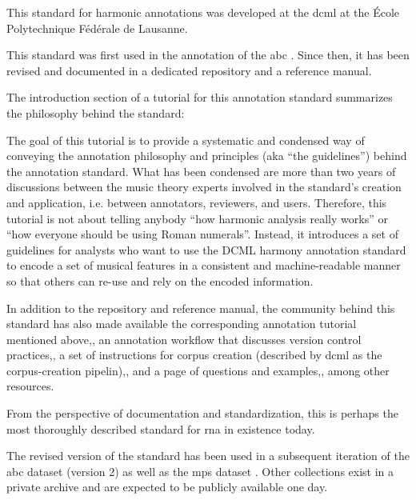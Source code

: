 

This standard for harmonic annotations was developed at the
\gls{dcml} at the \'Ecole Polytechnique F\'ed\'erale de
Lausanne.

This standard was first used in the annotation of the
\gls{abc}
\parencite{neuwirth2018annotated}. Since then, it has been
revised and documented in a dedicated
repository
and a reference
manual.

The introduction section of a tutorial for this annotation
standard summarizes the philosophy behind the standard:

\begin{italicquote}
    The goal of this tutorial is to provide a systematic and
    condensed way of conveying the annotation philosophy and
    principles (aka “the guidelines”) behind the annotation
    standard. What has been condensed are more than two
    years of discussions between the music theory experts
    involved in the standard's creation and application,
    i.e. between annotators, reviewers, and users.
    Therefore, this tutorial is not about telling anybody
    “how harmonic analysis really works” or “how everyone
    should be using Roman numerals”. Instead, it introduces
    a set of guidelines for analysts who want to use the
    DCML harmony annotation standard to encode a set of
    musical features in a consistent and machine-readable
    manner so that others can re-use and rely on the encoded
    information.
\end{italicquote}

In addition to the repository and reference manual, the
community behind this standard has also made available the
corresponding annotation tutorial mentioned
above,,
an annotation workflow that discusses version control
practices,,
a set of instructions for corpus creation (described by
\gls{dcml} as the corpus-creation
pipelin),,
and a page of questions and
examples,,
among other resources.


From the perspective of documentation and standardization,
this is perhaps the most thoroughly described standard for
\gls{rna} in existence today.

The revised version of the standard has been used in a
subsequent iteration of the \gls{abc} dataset (version 2) as
well as the \gls{mps} dataset
\parencite{hentschel2021annotated}. Other collections exist
in a private archive and are expected to be publicly
available one day.
